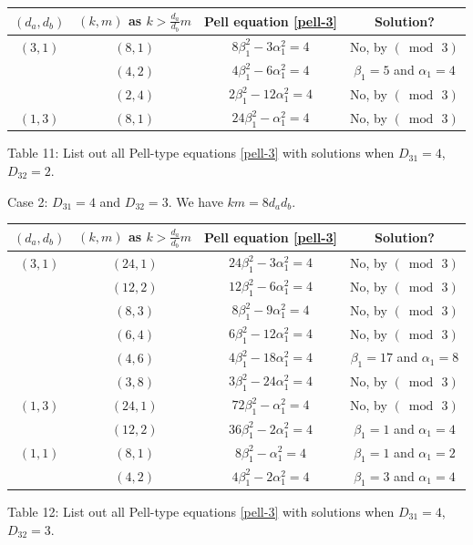 \documentclass[12pt]{article}
\begin{document}
\begin{center}
\begin{tabular}{|c|c|c|c|}
\hline $(d_a, d_b)$ & $(k, m)$ as $k > \frac{d_a}{d_b} m$ & Pell equation \eqref{pell-3} & Solution? \\
\hline $(3,1)$ & $(8,1)$ & $8\beta_1^2-3\alpha_1^2=4$ & No, by $(\bmod \, 3)$\\
\hline & $(4,2)$ & $4\beta_1^2-6\alpha_1^2=4$ & $\beta_1=5$ and $\alpha_1=4$\\
\hline & $(2,4)$ & $2\beta_1^2-12\alpha_1^2=4$ & No, by $(\bmod \, 3)$\\
\hline $(1,3)$ & $(8,1)$ & $24\beta_1^2-\alpha_1^2=4$ & No, by $(\bmod \, 3)$\\
\hline
\end{tabular}
\newline \small{Table 11: List out all Pell-type equations \eqref{pell-3} with solutions when $D_{31} = 4$, $D_{32} = 2$.}
\end{center}

Case 2: $D_{31}=4$ and $D_{32}=3$. We have $km=8 d_a d_b$.

\begin{center}
\begin{tabular}{|c|c|c|c|}
\hline $(d_a, d_b)$ & $(k, m)$ as $k > \frac{d_a}{d_b} m$ & Pell equation \eqref{pell-3} & Solution? \\
\hline $(3,1)$ & $(24,1)$ & $24\beta_1^2-3\alpha_1^2=4$ & No, by $(\bmod \, 3)$\\
\hline &$(12,2)$ & $12\beta_1^2-6\alpha_1^2=4$ & No, by $(\bmod \, 3)$\\
\hline & $(8,3)$ & $8\beta_1^2-9\alpha_1^2=4$ & No, by $(\bmod \, 3)$\\
\hline & $(6,4)$ & $6\beta_1^2-12\alpha_1^2=4$ & No, by $(\bmod \, 3)$\\
\hline & $(4,6)$ & $4\beta_1^2-18\alpha_1^2=4$ & $\beta_1=17$ and $\alpha_1=8$\\
\hline & $(3,8)$ & $3\beta_1^2-24\alpha_1^2=4$ & No, by $(\bmod \, 3)$\\
\hline $(1,3)$ & $(24,1)$ & $72\beta_1^2-\alpha_1^2=4$ & No, by $(\bmod \, 3)$\\
\hline & $(12,2)$ & $36\beta_1^2-2\alpha_1^2=4$ & $\beta_1=1$ and $\alpha_1=4$\\
\hline $(1,1)$ & $(8,1)$ & $8\beta_1^2-\alpha_1^2=4$ & $\beta_1=1$ and $\alpha_1=2$\\
\hline & $(4,2)$ & $4\beta_1^2-2\alpha_1^2=4$ & $\beta_1=3$ and $\alpha_1=4$\\
\hline
\end{tabular}
\newline \small{Table 12: List out all Pell-type equations \eqref{pell-3} with solutions when $D_{31} = 4$, $D_{32} = 3$.}
\end{center}
\end{document}
